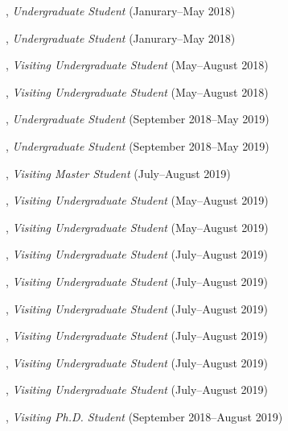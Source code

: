 \documentclass[10pt]{article}
\newenvironment{myindentpar}[1]%
{\begin{list}{}%
         {\setlength{\leftmargin}{#1}}%
         \item[]%
}
{\end{list}}
\newcounter{list}
\begin{document}
\begin{myindentpar}{0.75cm}
	
\hspace{-0.75cm}{\bf Matthew Malir}, \emph{Undergraduate Student} (Janurary--May 2018)
	
\hspace{-0.75cm}{\bf Sebastian Miner}, \emph{Undergraduate Student} (Janurary--May 2018)

\hspace{-0.75cm}{\bf Wenhao Yu}, \emph{Visiting Undergraduate Student} (May--August 2018)

\hspace{-0.75cm}{\bf Yu Shu}, \emph{Visiting Undergraduate Student} (May--August 2018)

\hspace{-0.75cm}{\bf Matthew Schoenbauer}, \emph{Undergraduate Student} (September 2018--May 2019)
	
\hspace{-0.75cm}{\bf Tina Wu}, \emph{Undergraduate Student} (September 2018--May 2019)
	
\hspace{-0.75cm}{\bf Zijian Hu}, \emph{Visiting Master Student} (July--August 2019)

\hspace{-0.75cm}{\bf Yihong Ma}, \emph{Visiting Undergraduate Student} (May--August 2019)

\hspace{-0.75cm}{\bf Chuchen Deng}, \emph{Visiting Undergraduate Student} (May--August 2019)

\hspace{-0.75cm}{\bf Zhihan Zhang}, \emph{Visiting Undergraduate Student} (July--August 2019)

\hspace{-0.75cm}{\bf Xin Liu}, \emph{Visiting Undergraduate Student} (July--August 2019)

\hspace{-0.75cm}{\bf Mengxia Yu}, \emph{Visiting Undergraduate Student} (July--August 2019)

\hspace{-0.75cm}{\bf Wei Peng}, \emph{Visiting Undergraduate Student} (July--August 2019)

\hspace{-0.75cm}{\bf Kaifeng Yu}, \emph{Visiting Undergraduate Student} (July--August 2019)

\hspace{-0.75cm}{\bf Yang Zhou}, \emph{Visiting Undergraduate Student} (July--August 2019)

\hspace{-0.75cm}{\bf Tianwen Jiang}, \emph{Visiting Ph.D. Student} (September 2018--August 2019)

\end{myindentpar}
\end{document}
